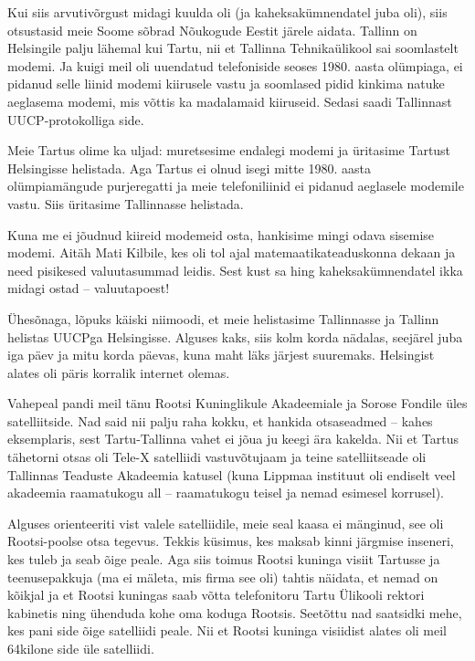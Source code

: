 Kui siis arvutivõrgust midagi kuulda oli (ja kaheksakümnendatel juba
oli), siis otsustasid meie Soome sõbrad Nõukogude Eestit järele
aidata. Tallinn on Helsingile palju lähemal kui Tartu, nii et Tallinna
Tehnikaülikool sai soomlastelt modemi. Ja
kuigi meil oli uuendatud telefoniside seoses 1980. aasta olümpiaga, ei pidanud
selle liinid modemi kiirusele vastu ja soomlased pidid kinkima natuke
aeglasema modemi, mis võttis ka madalamaid kiiruseid. Sedasi saadi Tallinnast
UUCP-protokolliga side.

Meie Tartus olime ka uljad: muretsesime
endalegi modemi ja üritasime Tartust Helsingisse helistada. Aga Tartus ei
olnud isegi mitte 1980. aasta olümpiamängude purjeregatti ja meie telefoniliinid
ei pidanud aeglasele modemile vastu. Siis üritasime
Tallinnasse helistada.

Kuna me ei jõudnud kiireid modemeid osta, hankisime
mingi odava sisemise modemi. Aitäh Mati Kilbile, kes oli tol ajal matemaatikateaduskonna dekaan ja need pisikesed valuutasummad
leidis. Sest kust sa hing kaheksakümnendatel ikka midagi ostad -- valuutapoest!

Ühesõnaga, lõpuks käiski niimoodi, et meie helistasime Tallinnasse ja Tallinn helistas UUCPga
Helsingisse. Alguses kaks, siis kolm korda nädalas, seejärel juba
iga päev ja mitu korda päevas, kuna maht läks järjest
suuremaks. Helsingist alates oli päris korralik internet olemas.


Vahepeal pandi meil tänu Rootsi Kuninglikule Akadeemiale ja
Sorose Fondile üles satelliitside. Nad said nii palju raha
kokku, et hankida otsaseadmed -- kahes eksemplaris, sest Tartu-Tallinna vahet ei
jõua ju keegi ära kakelda. Nii et Tartus tähetorni otsas oli
Tele-X satelliidi vastuvõtujaam ja teine satelliitseade oli Tallinnas Teaduste Akadeemia katusel (kuna Lippmaa
instituut oli endiselt veel
akadeemia raamatukogu all -- raamatukogu teisel ja nemad
esimesel korrusel).

Alguses orienteeriti vist valele satelliidile, meie seal kaasa ei mänginud, see
oli Rootsi-poolse otsa tegevus. Tekkis küsimus, kes maksab kinni
järgmise inseneri, kes tuleb ja seab õige peale. Aga siis toimus
Rootsi kuninga visiit Tartusse ja teenusepakkuja (ma ei mäleta, mis firma
see oli) tahtis näidata, et nemad on kõikjal ja et Rootsi kuningas saab võtta
telefonitoru Tartu Ülikooli rektori kabinetis ning ühenduda kohe oma koduga
Rootsis. Seetõttu nad saatsidki mehe, kes pani side õige satelliidi peale.
Nii et Rootsi kuninga visiidist alates oli meil 64kilone side üle satelliidi.

